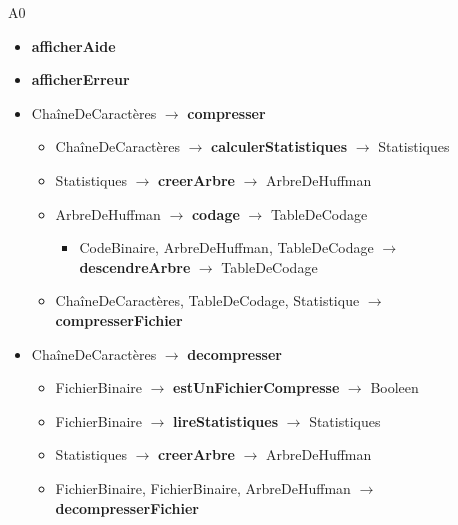 A0
\begin{itemize}
	\item \textbf{afficherAide}
	\item \textbf{afficherErreur}
	\item ChaîneDeCaractères $\rightarrow$ \textbf{compresser}
    \begin{itemize}
		\item ChaîneDeCaractères $\rightarrow$ \textbf{calculerStatistiques} $\rightarrow$ Statistiques
		\item Statistiques $\rightarrow$ \textbf{creerArbre} $\rightarrow$ ArbreDeHuffman
		\item ArbreDeHuffman $\rightarrow$ \textbf{codage} $\rightarrow$ TableDeCodage
        \begin{itemize}
            \item CodeBinaire, ArbreDeHuffman, TableDeCodage $\rightarrow$ \textbf{descendreArbre} $\rightarrow$ TableDeCodage
        \end{itemize}
		\item ChaîneDeCaractères, TableDeCodage, Statistique $\rightarrow$ \textbf{compresserFichier}
    \end{itemize}
	\item ChaîneDeCaractères $\rightarrow$ \textbf{decompresser}
    \begin{itemize}
        \item FichierBinaire $\rightarrow$ \textbf{estUnFichierCompresse} $\rightarrow$ Booleen
		\item FichierBinaire $\rightarrow$ \textbf{lireStatistiques} $\rightarrow$ Statistiques
		\item Statistiques $\rightarrow$ \textbf{creerArbre} $\rightarrow$ ArbreDeHuffman
		\item FichierBinaire, FichierBinaire, ArbreDeHuffman $\rightarrow$ \textbf{decompresserFichier}
    \end{itemize}
\end{itemize}  
